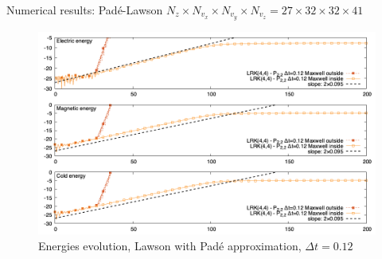 \documentclass{beamer}
\begin{document}
\begin{frame}{Numerical results: Padé-Lawson}
  {$N_z\times N_{v_x} \times N_{v_y} \times N_{v_z} = 27 \times 32 \times 32 \times 41$}
  \begin{figure}
    \includegraphics[height=0.75\textheight]{img/energy_lrkpt_m}
    \vspace{-0.25cm}
    \caption{Energies evolution, Lawson with Padé approximation, $\Delta t = 0.12$}
  \end{figure}
\end{frame}
\end{document}
